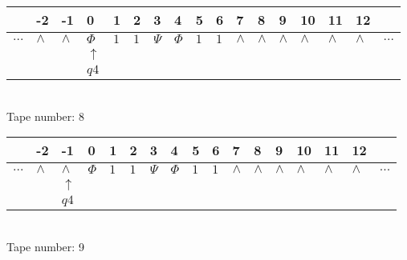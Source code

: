 \documentclass{article}
\begin{document}
\begin{table}[H]
\centering
\begin{tabular}{lllllllllllllllll}
 & -2 & -1 & 0 & 1 & 2 & 3 & 4 & 5 & 6 & 7 & 8 & 9 & 10 & 11 & 12 & \\
\hline
$...$ & \multicolumn{1}{|l|}{$\wedge$} & \multicolumn{1}{|l|}{$\wedge$} & \multicolumn{1}{|l|}{$\Phi$} & \multicolumn{1}{|l|}{$1$} & \multicolumn{1}{|l|}{$1$} & \multicolumn{1}{|l|}{$\Psi$} & \multicolumn{1}{|l|}{$\Phi$} & \multicolumn{1}{|l|}{$1$} & \multicolumn{1}{|l|}{$1$} & \multicolumn{1}{|l|}{$\wedge$} & \multicolumn{1}{|l|}{$\wedge$} & \multicolumn{1}{|l|}{$\wedge$} & \multicolumn{1}{|l|}{$\wedge$} & \multicolumn{1}{|l|}{$\wedge$} & \multicolumn{1}{|l|}{$\wedge$} & $...$\\
\hline
&  &  & $\uparrow$ &  &  &  &  &  &  &  &  &  &  &  &  &  \\
&  &  & $ q4 $ &  &  &  &  &  &  &  &  &  &  &  &  &  \\
\end{tabular}
\\
Tape number: 8
\noindent\makebox[\linewidth]{\hdashrule{\textwidth}{1pt}{1pt}}\end{table}

\begin{table}[H]
\centering
\begin{tabular}{lllllllllllllllll}
 & -2 & -1 & 0 & 1 & 2 & 3 & 4 & 5 & 6 & 7 & 8 & 9 & 10 & 11 & 12 & \\
\hline
$...$ & \multicolumn{1}{|l|}{$\wedge$} & \multicolumn{1}{|l|}{$\wedge$} & \multicolumn{1}{|l|}{$\Phi$} & \multicolumn{1}{|l|}{$1$} & \multicolumn{1}{|l|}{$1$} & \multicolumn{1}{|l|}{$\Psi$} & \multicolumn{1}{|l|}{$\Phi$} & \multicolumn{1}{|l|}{$1$} & \multicolumn{1}{|l|}{$1$} & \multicolumn{1}{|l|}{$\wedge$} & \multicolumn{1}{|l|}{$\wedge$} & \multicolumn{1}{|l|}{$\wedge$} & \multicolumn{1}{|l|}{$\wedge$} & \multicolumn{1}{|l|}{$\wedge$} & \multicolumn{1}{|l|}{$\wedge$} & $...$\\
\hline
&  & $\uparrow$ &  &  &  &  &  &  &  &  &  &  &  &  &  &  \\
&  & $ q4 $ &  &  &  &  &  &  &  &  &  &  &  &  &  &  \\
\end{tabular}
\\
Tape number: 9
\noindent\makebox[\linewidth]{\hdashrule{\textwidth}{1pt}{1pt}}\end{table}
\end{document}
